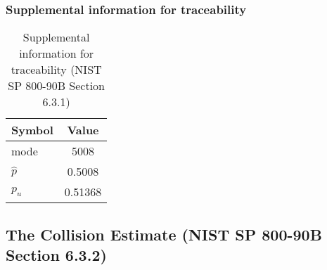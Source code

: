 \documentclass[a3paper,xelatex,english]{bxjsarticle}
\begin{document}
\subsubsection{Supplemental information for traceability}
\renewcommand{\arraystretch}{1.8}
\begin{table}[h]
\caption{Supplemental information for traceability (NIST SP 800-90B Section 6.3.1)}
\begin{center}
\begin{tabular}{|l|c|}
\hline 
\rowcolor{anotherlightblue} %
Symbol				& Value \\ \hline 
mode				&     5008\\ \hline 
$\hat{p}$ 			&   0.5008\\ \hline
$p_u$				&  0.51368\\ \hline
\end{tabular}
\end{center}
\end{table}
\renewcommand{\arraystretch}{1.4}
\clearpage
\subsection{The Collision Estimate (NIST SP 800-90B Section 6.3.2)}\label{sec:Binary632}
\end{document}
